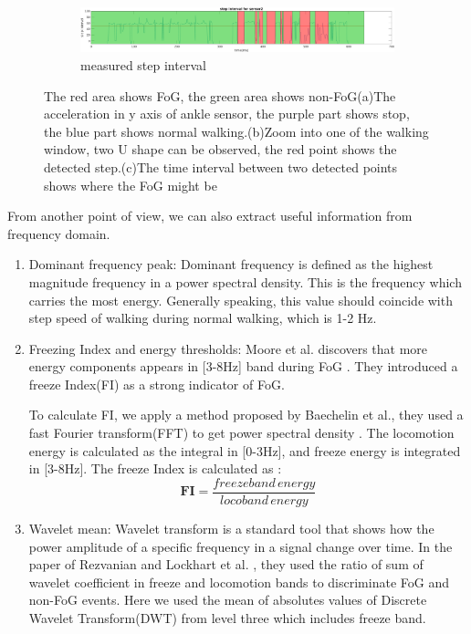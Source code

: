 \documentclass[article]{article}
\begin{document}
\begin{figure}
	
	\begin{subfigure}[b]{1\textwidth}
		\centering
		\includegraphics[width=\textwidth]{step_interval_fast_s2_p2}
		\caption{measured step interval}
		\label{interval}
	\end{subfigure}
	
	
	
	\caption{The red area shows FoG, the green area shows non-FoG(a)The acceleration in y axis of ankle sensor, the purple part shows stop, the blue part shows normal walking.(b)Zoom into one of the walking window, two U shape can be observed, the red point shows the detected step.(c)The time interval between two detected points shows where the FoG might be}
	\label{fig:three graphs}
\end{figure}

	From another point of view, we can also extract useful information from frequency domain.

	\begin{enumerate}
		\item Dominant frequency peak: Dominant frequency is defined as the highest magnitude frequency in a power spectral density. This is the frequency which carries the most energy. Generally speaking, this value should coincide with step speed of walking during normal walking, which is 1-2 Hz. 
	
		\item Freezing Index and energy thresholds: Moore et al. discovers that more energy components appears
			in [3-8Hz] band during FoG \cite{FI}. They introduced a freeze Index(FI) as a strong indicator of FoG.
			
			To calculate FI, we apply a method proposed by Baechelin et al., they used a fast Fourier transform(FFT) to get power spectral density \cite{FI1}. The locomotion energy is calculated as the integral in [0-3Hz], and freeze energy is integrated in [3-8Hz]. The freeze Index is calculated as :
			\begin{equation}
			\mathbf{FI} = \frac{freezeband\,energy}{locoband\,energy}
			\end{equation}			


	
		\item Wavelet mean: Wavelet transform is a standard tool that shows how the power amplitude of a specific frequency in a signal change over time. In the paper of Rezvanian and Lockhart et al. \cite{WM}, they used the ratio of sum of wavelet coefficient in freeze and locomotion bands to discriminate FoG and non-FoG events. Here we used the mean of absolutes values of Discrete Wavelet Transform(DWT) from level three which includes freeze band. 
	
	\end{enumerate}
\end{document}
